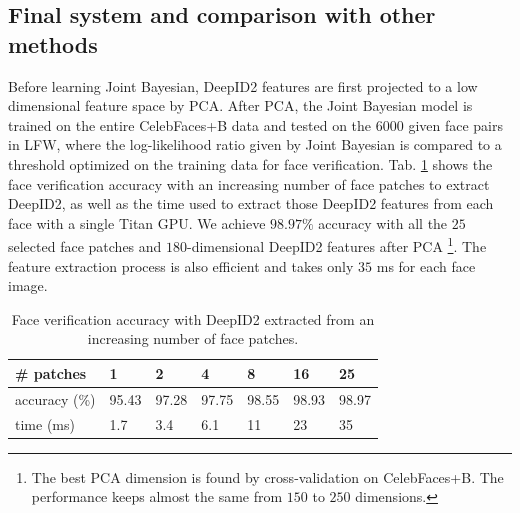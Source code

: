 \documentclass{article} %
\begin{document}
\subsection{Final system and comparison with other methods}
\label{ssec:compare}

Before learning Joint Bayesian, DeepID2 features are first projected to a low dimensional feature space by PCA. After PCA, the Joint Bayesian model is trained on the entire CelebFaces+B data and tested on the $6000$ given face pairs in LFW, where the log-likelihood ratio given by Joint Bayesian is compared to a threshold optimized on the training data for face verification. Tab. \ref{tab:patchnum} shows the face verification accuracy with an increasing number of face patches to extract DeepID2, as well as the time used to extract those DeepID2 features from each face with a single Titan GPU. We achieve $\bm{98.97\%}$ accuracy with all the $25$ selected face patches and $180$-dimensional DeepID2 features after PCA \footnote{The best PCA dimension is found by cross-validation on CelebFaces+B. The performance keeps almost the same from $150$ to $250$ dimensions.}. The feature extraction process is also efficient and takes only $35$ ms for each face image.

\begin{table}[t]
\caption{Face verification accuracy with DeepID2 extracted from an increasing number of face patches.}
\label{tab:patchnum}
\vspace{-0.0in}
\begin{center}
\begin{tabular}{p{55pt}|p{23pt}p{23pt}p{23pt}p{23pt}p{23pt}p{23pt}}
\toprule
\# patches & 1 & 2 & 4 & 8 & 16 & 25 \\
\midrule
accuracy (\%)   & 95.43 & 97.28 & 97.75 & 98.55 & 98.93 & 98.97 \\
time (ms) & 1.7 & 3.4 & 6.1 & 11 & 23 & 35 \\
\bottomrule
\end{tabular}
\end{center}
\vspace{-0.17in}
\end{table}
\end{document}
